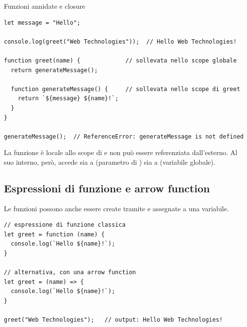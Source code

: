 \begin{esempio}{Funzioni annidate e closure}
\begin{affianco}[0.55][c]
\codicepiccolo
\begin{lstlisting}[style=js, name=closure.js]
let message = "Hello";

console.log(greet("Web Technologies"));  // Hello Web Technologies!

function greet(name) {             // sollevata nello scope globale
  return generateMessage();

  function generateMessage() {     // sollevata nello scope di greet
    return `${message} ${name}!`;
  }
}

generateMessage();  // ReferenceError: generateMessage is not defined
\end{lstlisting}
\risultato
\begin{immagine}
\end{immagine}
\end{affianco}

La funzione  è locale allo scope di  e non
può essere referenziata dall'esterno. Al suo interno, però, accede sia a
 (parametro di ) sia a  (variabile
globale).
\end{esempio}

\subsection{Espressioni di funzione e arrow function}

Le funzioni possono anche essere create tramite  e
assegnate a una variabile.

\begin{lstlisting}[style=js, name=espressioni.js]
// espressione di funzione classica
let greet = function (name) {
  console.log(`Hello ${name}!`);
}

// alternativa, con una arrow function
let greet = (name) => {
  console.log(`Hello ${name}!`);
}

greet("Web Technologies");   // output: Hello Web Technologies!
\end{lstlisting}


